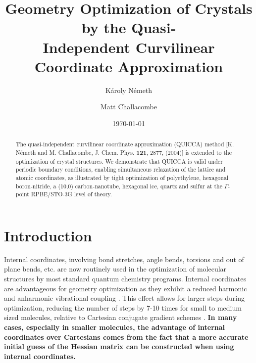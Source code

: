 \twolinestyle{\documentclass[prb,preprint]{revtex4}}
\begin{document}
\title{Geometry Optimization of Crystals by the Quasi-\\
       Independent Curvilinear Coordinate Approximation }


\author{K\'aroly N\'emeth}
\author{Matt Challacombe}

\date{\today}

\begin{abstract}
The quasi-independent curvilinear coordinate approximation (QUICCA) method 
[K. N\'emeth and M. Challacombe, J. Chem. Phys. {\bf 121}, 2877, (2004)] 
is extended to the optimization of crystal structures.  We demonstrate that QUICCA 
is valid under periodic boundary conditions, enabling simultaneous relaxation of the 
lattice and atomic coordinates, as illustrated by tight optimization of 
polyethylene, hexagonal boron-nitride, a (10,0) carbon-nanotube, hexagonal ice,
quartz and sulfur at the $\Gamma$-point RPBE/STO-3G level of theory.
\end{abstract}


\maketitle


\section{Introduction}
Internal coordinates, involving bond stretches, angle bends, torsions and out of plane bends, etc. 
are now routinely used in the optimization of 
molecular structures by most standard quantum chemistry programs. 
Internal coordinates are advantageous for geometry optimization as 
they exhibit a reduced harmonic and anharmonic vibrational coupling 
\cite{PPulay69,GFogarasi79,GFogarasi92,PPulay77}.
This effect allows for larger steps during optimization, reducing the 
number of steps by 7-10 times for small to medium sized molecules, relative 
to Cartesian conjugate gradient schemes \cite{TBucko05}.
{\bf In many cases, especially in smaller molecules, the advantage of 
internal coordinates over Cartesians comes from the fact that
a more accurate initial guess of the Hessian matrix can be 
constructed when using internal coordinates.}
\end{document}
